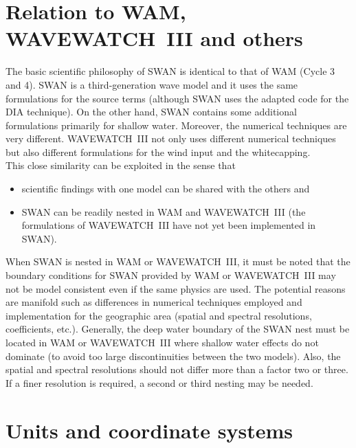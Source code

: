 \documentclass[12pt]{book}
\begin{document}
\section{Relation to WAM, WAVEWATCH~III and others}
The basic scientific philosophy of SWAN is identical to that of WAM (Cycle 3 and 4). SWAN is a third-generation
wave model and it uses the same formulations for the source terms (although SWAN uses the adapted code for the
DIA technique). On the other hand, SWAN contains some additional formulations primarily for shallow water.
Moreover, the numerical techniques are very different. WAVEWATCH~III not only uses different numerical techniques
but also different formulations for the wind input and the whitecapping.
\\[2ex]
\noindent
This close similarity can be exploited in the sense that
\begin{itemize}
  \item scientific findings with one model can be shared with the others and
  \item SWAN can be readily nested in WAM and WAVEWATCH~III (the formulations of WAVEWATCH~III
        have not yet been implemented in SWAN).
\end{itemize}
When SWAN is nested in WAM or WAVEWATCH~III, it must be noted that the boundary conditions for
SWAN provided by WAM or WAVEWATCH~III may not be model consistent even if the same physics are
used. The potential reasons are manifold such as differences in numerical techniques employed and
implementation for the geographic area (spatial and spectral resolutions, coefficients, etc.). Generally,
the deep water boundary of the SWAN nest must be located in WAM or WAVEWATCH~III  where shallow
water effects do not dominate (to avoid too large discontinuities between the two models). Also, the
spatial and spectral resolutions should not differ more than a factor two or three. If a finer resolution is
required, a second or third nesting may be needed.

\section{Units and coordinate systems}
\label{sec:units}
\end{document}
